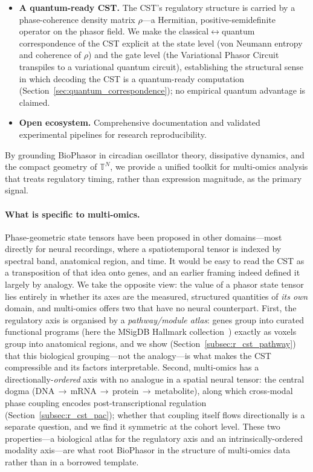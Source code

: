 \documentclass[preprint,12pt,amsmath,amssymb,superscriptaddress,floatfix]{revtex4-2}
\newcommand{\torus}{\mathbb{T}}
\begin{document}
\begin{itemize}
    \item \textbf{A quantum-ready CST.}
    The CST's regulatory structure is carried by a phase-coherence density matrix
    $\rho$---a Hermitian, positive-semidefinite operator on the phasor field. We
    make the classical$\leftrightarrow$quantum correspondence of the CST explicit
    at the state level (von Neumann entropy and coherence of $\rho$) and the gate
    level (the Variational Phasor Circuit transpiles to a variational quantum
    circuit), establishing the structural sense in which decoding the CST is a
    quantum-ready computation (Section~\ref{sec:quantum_correspondence}); no
    empirical quantum advantage is claimed.

    \item \textbf{Open ecosystem.}
    Comprehensive documentation and validated experimental
    pipelines for research reproducibility.
\end{itemize}

By grounding BioPhasor in circadian oscillator theory, dissipative dynamics,
and the compact geometry of $\torus^N$, we provide a unified toolkit for
multi-omics analysis that treats regulatory timing, rather than expression
magnitude, as the primary signal.

\paragraph{What is specific to multi-omics.}
Phase-geometric state tensors have been proposed in other domains---most
directly for neural recordings, where a spatiotemporal tensor is indexed by
spectral band, anatomical region, and time. It would be easy to read the CST as
a transposition of that idea onto genes, and an earlier framing indeed defined
it largely by analogy. We take the opposite view: the value of a phasor state
tensor lies entirely in whether its axes are the measured, structured
quantities of \emph{its own} domain, and multi-omics offers two that have no
neural counterpart. First, the regulatory axis is organised by a
\emph{pathway/module atlas}: genes group into curated functional programs
(here the MSigDB Hallmark collection~\cite{ref_liberzon_hallmark}) exactly as
voxels group into anatomical regions, and we show
(Section~\ref{subsec:r_cst_pathway}) that this biological grouping---not the
analogy---is what makes the CST compressible and its factors interpretable.
Second, multi-omics has a directionally-\emph{ordered} axis with no analogue in
a spatial neural tensor: the central dogma
(DNA\,$\rightarrow$\,mRNA\,$\rightarrow$\,protein\,$\rightarrow$\,metabolite),
along which cross-modal phase coupling encodes post-transcriptional regulation
(Section~\ref{subsec:r_cst_pac}); whether that coupling itself flows
directionally is a separate question, and we find it symmetric at the cohort
level. These two properties---a biological atlas for the regulatory axis and an
intrinsically-ordered modality axis---are what root BioPhasor in the structure
of multi-omics data rather than in a borrowed template.
\end{document}
